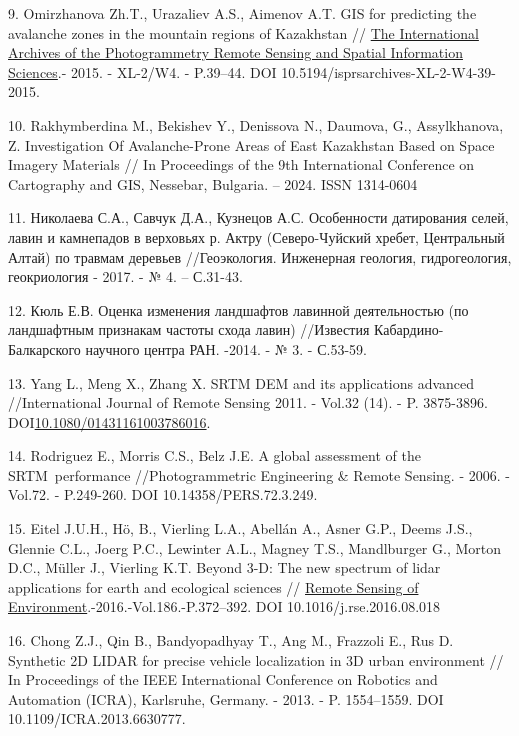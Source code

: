 \begin{references}
9. Omirzhanova Zh.T., Urazaliev A.S., Aimenov A.T. GIS for predicting
the avalanche zones in the mountain regions of Kazakhstan //
\href{https://www.researchgate.net/journal/The-International-Archives-of-the-Photogrammetry-Remote-Sensing-and-Spatial-Information-Sciences-2194-9034?_tp=eyJjb250ZXh0Ijp7ImZpcnN0UGFnZSI6InB1YmxpY2F0aW9uIiwicGFnZSI6InB1YmxpY2F0aW9uIn19}{The
International Archives of the Photogrammetry Remote Sensing and Spatial
Information Sciences}.- 2015. - XL-2/W4. - P.39--44. DOI
10.5194/isprsarchives-XL-2-W4-39-2015.

10. Rakhymberdina M., Bekishev Y., Denissova N., Daumova, G.,
Assylkhanova, Z. Investigation Of Avalanche-Prone Areas of East
Kazakhstan Based on Space Imagery Materials // In Proceedings of the 9th
International Conference on Cartography and GIS, Nessebar, Bulgaria. --
2024. ISSN 1314-0604

11. Николаева С.А., Савчук Д.А., Кузнецов А.С. Особенности датирования
селей, лавин и камнепадов в верховьях р. Актру (Северо-Чуйский хребет,
Центральный Алтай) по травмам деревьев //Геоэкология. Инженерная
геология, гидрогеология, геокриология - 2017. - № 4. -- С.31-43.

12. Кюль Е.В. Оценка изменения ландшафтов лавинной деятельностью (по
ландшафтным признакам частоты схода лавин) //Известия
Кабардино-Балкарского научного центра РАН. -2014. - № 3. - С.53-59.

13. Yang L., Meng X., Zhang X. SRTM DEM and its applications advanced
//International Journal of Remote Sensing 2011. - Vol.32 (14). - P.
3875-3896.
DOI\href{http://dx.doi.org/10.1080/01431161003786016}{10.1080/01431161003786016}.

14. Rodriguez E., Morris C.S., Belz J.E. A global assessment of the
SRTM~performance //Photogrammetric Engineering \& Remote Sensing. -
2006. -Vol.72. - P.249-260. DOI 10.14358/PERS.72.3.249.

15. Eitel J.U.H., Hö, B., Vierling L.A., Abellán A., Asner G.P., Deems
J.S., Glennie C.L., Joerg P.C., Lewinter A.L., Magney T.S., Mandlburger
G., Morton D.C., Müller J., Vierling K.T. Beyond 3-D: The new spectrum
of lidar applications for earth and ecological sciences //
\href{https://asu.elsevierpure.com/en/publications/beyond-3-d-the-new-spectrum-of-lidar-applications-for-earth-and-e}{\hfill\break
Remote Sensing of Environment}.-2016.-Vol.186.-P.372--392. DOI
10.1016/j.rse.2016.08.018

16. Chong Z.J., Qin B., Bandyopadhyay T., Ang M., Frazzoli E., Rus D.
Synthetic 2D LIDAR for precise vehicle localization in 3D urban
environment // In Proceedings of the IEEE International Conference on
Robotics and Automation (ICRA), Karlsruhe, Germany. - 2013. - P.
1554--1559. DOI 10.1109/ICRA.2013.6630777.


\end{references}
